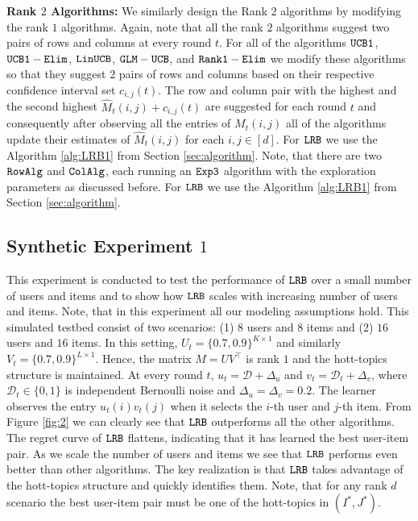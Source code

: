 \textbf{Rank $2$ Algorithms:} We similarly design the Rank $2$ algorithms by modifying the rank $1$ algorithms. Again, note that all the rank $2$ algorithms suggest two pairs of rows and columns at every round $t$. For all of the algorithms ${\tt UCB1}$, ${\tt UCB1-Elim}$, ${\tt LinUCB}$, $\tt GLM-UCB$, and $\tt Rank1-Elim$ we modify these algorithms so that they suggest $2$ pairs of rows and columns based on their respective confidence interval set $c_{i, j}(t)$. The row and column pair with the highest and the second highest $\hat{M}_{t}(i,j) + c_{i, j}(t)$ are suggested for each round $t$ and consequently after observing all the entries of $M_t(i,j)$ all of the algorithms update their estimates of $\hat{M}_{t}(i,j)$ for each $i,j \in [d]$. For ${\tt LRB}$ we use the Algorithm \ref{alg:LRB1} from Section \ref{sec:algorithm}. Note, that there are two ${\tt RowAlg}$ and ${\tt ColAlg}$, each running an ${\tt Exp3}$ algorithm with the  exploration parameters as discussed before. For ${\tt LRB}$ we use the Algorithm \ref{alg:LRB1} from Section \ref{sec:algorithm}. 

\subsection{Synthetic Experiment $1$}
This experiment is conducted to test the performance of ${\tt LRB}$ over a small number of users and items and to show how ${\tt LRB}$ scales with increasing number of users and items. Note, that in this experiment all our modeling assumptions hold. This simulated testbed consist of two scenarios: (1) $8$ users and $8$ items and (2) $16$ users and $16$ items. In this setting, $U_t = \{0.7, 0.9\}^{K\times 1}$ and similarly $V_t = \{0.7, 0.9\}^{L\times 1}$. Hence, the matrix $M = UV^{\intercal}$ is rank $1$ and the hott-topics structure is maintained. At every round $t$, $u_t = \mathcal{D} + \Delta_u$ and $v_t =  \mathcal{D}_t  + \Delta_v$, where $\mathcal{D}_t \in \{0,1\}$ is independent Bernoulli noise and $\Delta_u = \Delta_v = 0.2$. The learner observes the entry $u_t(i)v_t(j)$ when it selects the $i$-th user and $j$-th item. From Figure \ref{fig:2} we can clearly see that ${\tt LRB}$ outperforms all the other algorithms. The regret curve of ${\tt LRB}$ flattens, indicating that it has learned the best user-item pair. As we scale the number of users and items we see that ${\tt LRB}$ performs even better than other algorithms. The key realization is that ${\tt LRB}$ takes advantage of the hott-topics structure and quickly identifies them. Note, that for any rank $d$ scenario the best user-item pair must be one of the hott-topics in $(I^*, J^*)$.


